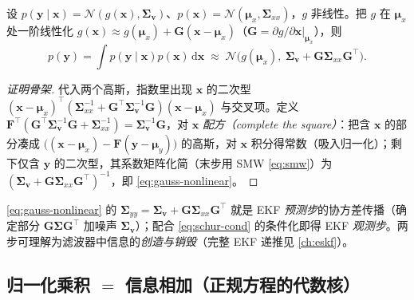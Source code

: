 \begin{proposition}\label{prop:gauss-nonlinear}
设 $p(\mathbf{y}\mid\mathbf{x})=\mathcal{N}(g(\mathbf{x}),\boldsymbol{\Sigma}_{\mathbf{v}})$、$p(\mathbf{x})=\mathcal{N}(\boldsymbol{\mu}_x,\boldsymbol{\Sigma}_{xx})$，$g$ 非线性。把 $g$ 在 $\boldsymbol{\mu}_x$ 处一阶线性化 $g(\mathbf{x})\approx g(\boldsymbol{\mu}_x)+\mathbf{G}(\mathbf{x}-\boldsymbol{\mu}_x)$（$\mathbf{G}=\partial g/\partial\mathbf{x}|_{\boldsymbol{\mu}_x}$），则
\begin{equation}
  p(\mathbf{y})=\int p(\mathbf{y}\mid\mathbf{x})p(\mathbf{x})\,\mathrm{d}\mathbf{x}
  \;\approx\;\mathcal{N}\big(g(\boldsymbol{\mu}_x),\ \boldsymbol{\Sigma}_{\mathbf{v}}+\mathbf{G}\boldsymbol{\Sigma}_{xx}\mathbf{G}^\top\big).
  \label{eq:gauss-nonlinear}
\end{equation}
\end{proposition}
\begin{proof}[证明骨架]
代入两个高斯，指数里出现 $\mathbf{x}$ 的二次型 $(\mathbf{x}-\boldsymbol{\mu}_x)^\top(\boldsymbol{\Sigma}_{xx}^{-1}+\mathbf{G}^\top\boldsymbol{\Sigma}_{\mathbf{v}}^{-1}\mathbf{G})(\mathbf{x}-\boldsymbol{\mu}_x)$ 与交叉项。定义 $\mathbf{F}^\top(\mathbf{G}^\top\boldsymbol{\Sigma}_{\mathbf{v}}^{-1}\mathbf{G}+\boldsymbol{\Sigma}_{xx}^{-1})=\boldsymbol{\Sigma}_{\mathbf{v}}^{-1}\mathbf{G}$，对 $\mathbf{x}$ \emph{配方（complete the square）}：把含 $\mathbf{x}$ 的部分凑成 $\big((\mathbf{x}-\boldsymbol{\mu}_x)-\mathbf{F}(\mathbf{y}-\boldsymbol{\mu}_y)\big)$ 的高斯，对 $\mathbf{x}$ 积分得常数（吸入归一化）；剩下仅含 $\mathbf{y}$ 的二次型，其系数矩阵化简（末步用 SMW \cref{eq:smw}）为 $(\boldsymbol{\Sigma}_{\mathbf{v}}+\mathbf{G}\boldsymbol{\Sigma}_{xx}\mathbf{G}^\top)^{-1}$，即 \cref{eq:gauss-nonlinear}。
\end{proof}
\noindent \cref{eq:gauss-nonlinear} 的 $\boldsymbol{\Sigma}_{yy}=\boldsymbol{\Sigma}_{\mathbf{v}}+\mathbf{G}\boldsymbol{\Sigma}_{xx}\mathbf{G}^\top$ 就是 EKF \emph{预测步}的协方差传播（确定部分 $\mathbf{G}\boldsymbol{\Sigma}\mathbf{G}^\top$ 加噪声 $\boldsymbol{\Sigma}_{\mathbf{v}}$）；配合 \cref{eq:schur-cond} 的条件化即得 EKF \emph{观测步}。两步可理解为滤波器中信息的\emph{创造与销毁}\cite{barfoot2024state}（完整 EKF 递推见 \cref{ch:eskf}）。

\subsection{归一化乘积 $=$ 信息相加（正规方程的代数核）}
\label{sec:est-info-add}


